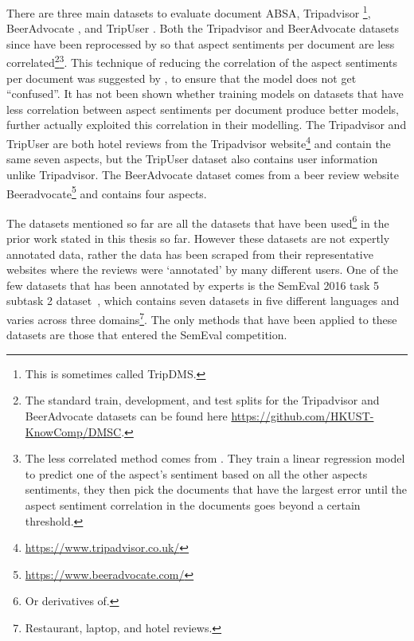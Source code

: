 There are three main datasets to evaluate document ABSA, Tripadvisor \citep{Wang2010LatentAR}\footnote{This is sometimes called TripDMS.}, BeerAdvocate \citep{mcauley2012learning}, and TripUser \citep{li-etal-2018-document}. Both the Tripadvisor and BeerAdvocate datasets since have been reprocessed by \citet{yin-etal-2017-document} so that aspect sentiments per document are less correlated\footnote{The standard train, development, and test splits for the Tripadvisor and BeerAdvocate datasets can be found here \url{https://github.com/HKUST-KnowComp/DMSC}.}\footnote{The less correlated method comes from \citet[\S5.1]{lei-etal-2016-rationalizing}. They train a linear regression model to predict one of the aspect's sentiment based on all the other aspects sentiments, they then pick the documents that have the largest error until the aspect sentiment correlation in the documents goes beyond a certain threshold.}. This technique of reducing the correlation of the aspect sentiments per document was suggested by \citet{lei-etal-2016-rationalizing}, to ensure that the model does not get ``confused''. It has not been shown whether training models on datasets that have less correlation between aspect sentiments per document produce better models, further \citet{snyder-barzilay-2007-multiple} actually exploited this correlation in their modelling. The Tripadvisor and TripUser are both hotel reviews from the Tripadvisor website\footnote{\url{https://www.tripadvisor.co.uk/}} and contain the same seven aspects, but the TripUser dataset also contains user information unlike Tripadvisor. The BeerAdvocate dataset comes from a beer review website Beeradvocate\footnote{\url{https://www.beeradvocate.com/}} and contains four aspects.

The datasets mentioned so far are all the datasets that have been used\footnote{Or derivatives of.} in the prior work stated in this thesis so far. However these datasets are not expertly annotated data, rather the data has been scraped from their representative websites where the reviews were `annotated' by many different users. One of the few datasets that has been annotated by experts is the SemEval 2016 task 5 subtask 2 dataset~\citep{pontiki-etal-2016-semeval}, which contains seven datasets in five different languages and varies across three domains\footnote{Restaurant, laptop, and hotel reviews.}. The only methods that have been applied to these datasets are those that entered the SemEval competition.

